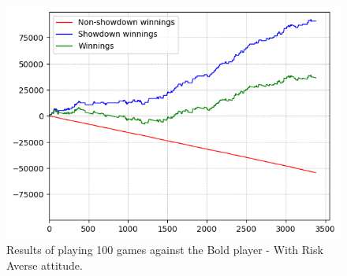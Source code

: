 \begin{figure}[H]
\begin{minipage}{\textwidth}
\begin{minipage}{0.5\textwidth}
            \includegraphics[width=\textwidth]{graphics/risk-averse/bold.png}
        \end{minipage}
    \end{minipage}
    \caption{Results of playing 100 games against the Bold player - With Risk Averse attitude.}
    \label{fig:results_averse_bold}
\end{figure}

